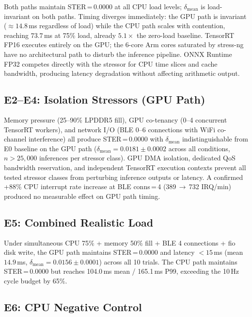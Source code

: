 \documentclass[journal,10pt,twocolumn]{IEEEtran}
\begin{document}
Both paths maintain STER\,=\,0.0000 at all CPU load levels;
$\delta_\text{mean}$ is load-invariant on both paths.
Timing diverges immediately: the GPU path is invariant
(${\approx}14.8$\,ms regardless of load) while the CPU path
scales with contention, reaching $73.7$\,ms at 75\% load, already $5.1{\times}$ the zero-load baseline.
TensorRT FP16 executes entirely on the GPU; the 6-core Arm cores
saturated by stress-ng have no architectural path to disturb the
inference pipeline.
ONNX Runtime FP32 competes directly with the stressor for CPU time
slices and cache bandwidth, producing latency degradation without
affecting arithmetic output.

\subsection{E2--E4: Isolation Stressors (GPU Path)}

Memory pressure (25--90\% LPDDR5 fill), GPU co-tenancy (0--4
concurrent TensorRT workers), and network I/O (BLE 0--6 connections
with WiFi co-channel interference) all produce STER\,=\,0.0000 with
$\delta_\text{mean}$ indistinguishable from E0 baseline on the GPU path
($\delta_\text{mean}{=}0.0181\pm0.0002$ across all conditions, $n{>}25{,}000$
inferences per stressor class).
GPU DMA isolation, dedicated QoS bandwidth reservation, and independent
TensorRT execution contexts prevent all tested stressor classes from
perturbing inference outputs or latency.
A confirmed +88\% CPU interrupt rate increase at BLE conns\,=\,4
(389\,$\to$\,732 IRQ/min) produced no measurable effect on GPU path
timing.

\subsection{E5: Combined Realistic Load}

Under simultaneous CPU 75\% + memory 50\% fill + BLE 4 connections
+ fio disk write, the GPU path maintains STER\,=\,0.0000 and latency
${<}15$\,ms (mean $14.9$\,ms, $\delta_\text{mean}{=}0.0156\pm0.0001$)
across all 10 trials.
The CPU path maintains STER\,=\,0.0000 but reaches 104.0\,ms mean /
165.1\,ms P99, exceeding the 10\,Hz cycle budget by 65\%.

\subsection{E6: CPU Negative Control}
\end{document}
